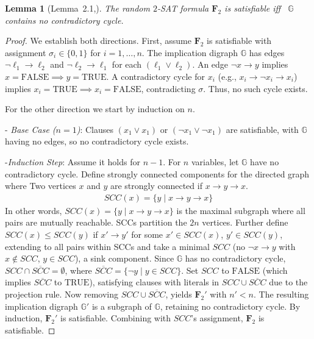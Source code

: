 \documentclass[11pt,reqno]{amsart}
\numberwithin{equation}{section}
\renewcommand{\vec}[1]{\boldsymbol{#1}}
\newcommand\vF{\vec F}
\newcommand\GG{\mathbb{G}}
\newcommand\Lem{Lemma}
\newtheorem{lemma}[definition]{Lemma}
\begin{document}
	\begin{lemma}[\Lem~2.1,\cite{BBCKW}]\label{lem_contradict_cycle}
		The random $2$-SAT formula $\vF_2$ is satisfiable iff~  $\GG$ contains no contradictory cycle.
	\end{lemma}
\begin{proof}
We establish both directions. 
First, assume \(\vF_2\) is satisfiable with assignment \(\sigma_i \in \{0, 1\}\) for \(i = 1, \ldots, n\). The implication digraph \(\GG\) has edges \(\neg \ell_1 \to \ell_2\) and \(\neg \ell_2 \to \ell_1\) for each \((\ell_1 \vee \ell_2)\). An edge \(\neg x \to y\) implies \(x = \text{FALSE} \implies y = \text{TRUE}\). A contradictory cycle for \(x_i\) (e.g., \(x_i \to \neg x_i \to x_i\)) implies \(x_i = \text{TRUE} \implies x_i = \text{FALSE}\), contradicting \(\sigma\). Thus, no such cycle exists.

For the other direction we start by induction on \(n\).

- \emph{Base Case (\(n = 1\))}: Clauses \((x_1 \vee x_1)\) or \((\neg x_1 \vee \neg x_1)\) are satisfiable, with \(\GG\) having no edges, so no contradictory cycle exists.

-\emph{Induction Step}: Assume it holds for \(n-1\). 
For \(n\) variables, let \(\GG\) have no contradictory cycle.
Define strongly connected components for the directed graph where  Two vertices \(x\) and \(y\) are strongly connected if \(x \to y \to x\).  
\begin{align*}
 	SCC(x) = \{y \mid x \to y \to x\}
\end{align*}
In other words, \(SCC(x) = \{ y \mid x \to y \to x \}\) is the maximal subgraph where all pairs are mutually reachable. SCCs partition the \(2n\) vertices.    
Further define \(SCC(x) \leq SCC(y)\) if \(x' \to y'\) for some \(x' \in SCC(x)\), \(y' \in SCC(y)\), extending to all pairs within SCCs and take a minimal \(SCC\) (no \(\neg x \to y\) with \(x \notin SCC\), \(y \in SCC\)), a sink component.    
 Since \(\GG\) has no contradictory cycle, \(SCC \cap \overline{SCC} = \emptyset\), where \(\overline{SCC} = \{\neg y \mid y \in SCC\}\).   
 Set \(SCC\) to \(\text{FALSE}\) (which implies \(\overline{SCC}\) to \(\text{TRUE}\)), satisfying clauses with literals in \(SCC \cup \overline{SCC}\) due to the projection rule.    
 Now removing \(SCC \cup \overline{SCC}\), yields \(\vF_2'\) with \(n' < n\). 
 The resulting implication digraph \(\GG'\) is a subgraph of \(\GG\), retaining no contradictory cycle.    
 By induction, \(\vF_2'\) is satisfiable. 
 Combining with \(SCC\)’s assignment, \(\vF_2\) is satisfiable.
\end{proof}		
	
\end{document}
